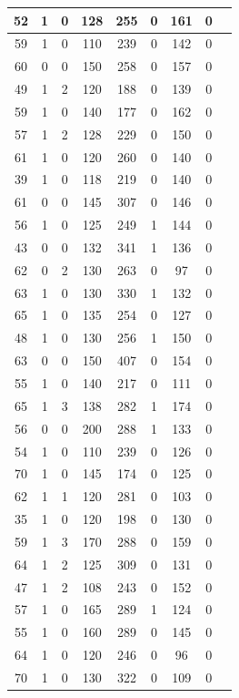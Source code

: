 \documentclass{article}
\begin{document}
\begin{longtable}{
|
c|c|c|c|c|c|c|c|c|}
\hline
52 & 1 & 0 & 128 & 255 & 0 & 161 & 0 \\
\hline
59 & 1 & 0 & 110 & 239 & 0 & 142 & 0 \\
\hline
60 & 0 & 0 & 150 & 258 & 0 & 157 & 0 \\
\hline
49 & 1 & 2 & 120 & 188 & 0 & 139 & 0 \\
\hline
59 & 1 & 0 & 140 & 177 & 0 & 162 & 0 \\
\hline
57 & 1 & 2 & 128 & 229 & 0 & 150 & 0 \\
\hline
61 & 1 & 0 & 120 & 260 & 0 & 140 & 0 \\
\hline
39 & 1 & 0 & 118 & 219 & 0 & 140 & 0 \\
\hline
61 & 0 & 0 & 145 & 307 & 0 & 146 & 0 \\
\hline
56 & 1 & 0 & 125 & 249 & 1 & 144 & 0 \\
\hline
43 & 0 & 0 & 132 & 341 & 1 & 136 & 0 \\
\hline
62 & 0 & 2 & 130 & 263 & 0 & 97 & 0 \\
\hline
63 & 1 & 0 & 130 & 330 & 1 & 132 & 0 \\
\hline
65 & 1 & 0 & 135 & 254 & 0 & 127 & 0 \\
\hline
48 & 1 & 0 & 130 & 256 & 1 & 150 & 0 \\
\hline
63 & 0 & 0 & 150 & 407 & 0 & 154 & 0 \\
\hline
55 & 1 & 0 & 140 & 217 & 0 & 111 & 0 \\
\hline
65 & 1 & 3 & 138 & 282 & 1 & 174 & 0 \\
\hline
56 & 0 & 0 & 200 & 288 & 1 & 133 & 0 \\
\hline
54 & 1 & 0 & 110 & 239 & 0 & 126 & 0 \\
\hline
70 & 1 & 0 & 145 & 174 & 0 & 125 & 0 \\
\hline
62 & 1 & 1 & 120 & 281 & 0 & 103 & 0 \\
\hline
35 & 1 & 0 & 120 & 198 & 0 & 130 & 0 \\
\hline
59 & 1 & 3 & 170 & 288 & 0 & 159 & 0 \\
\hline
64 & 1 & 2 & 125 & 309 & 0 & 131 & 0 \\
\hline
47 & 1 & 2 & 108 & 243 & 0 & 152 & 0 \\
\hline
57 & 1 & 0 & 165 & 289 & 1 & 124 & 0 \\
\hline
55 & 1 & 0 & 160 & 289 & 0 & 145 & 0 \\
\hline
64 & 1 & 0 & 120 & 246 & 0 & 96 & 0 \\
\hline
70 & 1 & 0 & 130 & 322 & 0 & 109 & 0 \\

\end{longtable}
\end{document}
